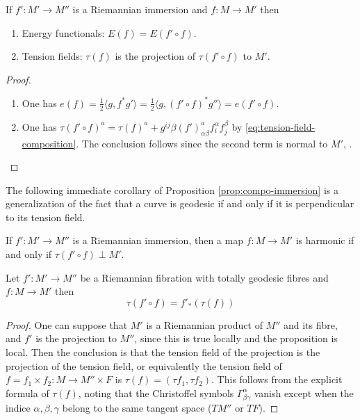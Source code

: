 \begin{proposition}
\label{prop:compo-immersion}
If \(f': M' \longrightarrow M''\) is a Riemannian immersion and \(f: M \longrightarrow
M'\) then 
\begin{enumerate}
\item Energy functionals: \(E(f) = E(f'\circ f)\).
\item Tension fields: \(\tau(f)\) is the projection of \(\tau(f'\circ f)\) to \(M'\).
\end{enumerate}
\end{proposition}
\begin{proof}
\begin{enumerate}
\item One has \(e(f) = \frac{1}{2}\langle g, f^* g' \rangle  = \frac{1}{2}\langle g,
   (f'\circ f)^* g'' \rangle = e(f'\circ f)\).
\item One has \(\tau(f'\circ f)^a  = \tau(f)^a +
   g^{ij}\beta(f')^a_{\alpha\beta} f^\alpha_i f^\beta_j\) by
\eqref{eq:tension-field-composition}. The conclusion follows since the second term is normal to \(M'\), .
\end{enumerate}
\end{proof}

The following immediate corollary of Proposition \ref{prop:compo-immersion} is a generalization of the fact that a curve is geodesic if and only if it
is perpendicular to its tension field.

\begin{corollary}
If \(f': M' \longrightarrow M''\) is a Riemannian immersion, then a map \(f: M \longrightarrow M'\) is harmonic if and only if \(\tau(f'\circ f) \perp M'\).
\end{corollary}


\iffalse


\begin{proposition}
\label{prop:compo-submersion}
Let \(f': M' \longrightarrow M''\) be a Riemannian fibration with totally geodesic
fibres and \(f: M \longrightarrow M'\) then 
\[
\tau(f'\circ f) = f'_*(\tau(f))  
\]
\end{proposition}

\begin{proof}
One can suppose that \(M'\) is a Riemannian product of \(M''\) and its fibre, and
\(f'\) is the projection to \(M''\), since this is true locally and the proposition is
local. Then the conclusion is that the tension field of the projection is the projection
of the tension field, or equivalently the tension field of \(f= f_1\times f_2: M \longrightarrow
M''\times F\) is \(\tau(f) = (\tau f_1,\tau f_2)\). This follows from the explicit
formula of \(\tau(f)\), noting that the Christoffel symbols \(\Gamma^\alpha_{\beta\gamma}\) vanish except when the indice \(\alpha,\beta,\gamma\)
belong to the same tangent space (\(TM''\) or \(TF\)).
\end{proof}

